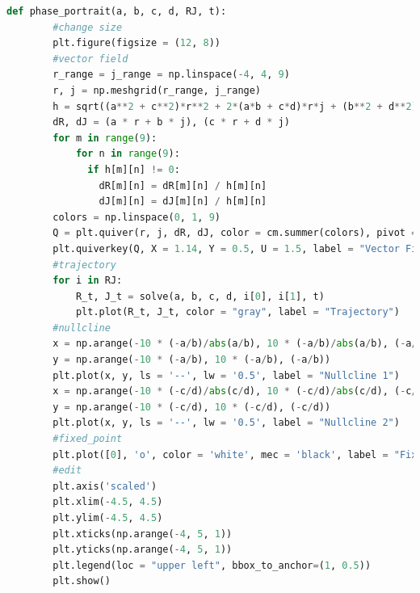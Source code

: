 \documentclass[a4paper]{article}
\begin{document}
\begin{lstlisting}[language=Python] 
    def phase_portrait(a, b, c, d, RJ, t):
        #change size
        plt.figure(figsize = (12, 8))
        #vector field
        r_range = j_range = np.linspace(-4, 4, 9)
        r, j = np.meshgrid(r_range, j_range)
        h = sqrt((a**2 + c**2)*r**2 + 2*(a*b + c*d)*r*j + (b**2 + d**2)*j**2)
        dR, dJ = (a * r + b * j), (c * r + d * j)
        for m in range(9):
            for n in range(9):
              if h[m][n] != 0:
                dR[m][n] = dR[m][n] / h[m][n]
                dJ[m][n] = dJ[m][n] / h[m][n]
        colors = np.linspace(0, 1, 9)
        Q = plt.quiver(r, j, dR, dJ, color = cm.summer(colors), pivot = "mid", headlength = 4, headaxislength = 4, headwidth = 4)
        plt.quiverkey(Q, X = 1.14, Y = 0.5, U = 1.5, label = "Vector Field", labelpos = 'E', labelsep = 0.1)
        #trajectory
        for i in RJ:
            R_t, J_t = solve(a, b, c, d, i[0], i[1], t)
            plt.plot(R_t, J_t, color = "gray", label = "Trajectory")
        #nullcline
        x = np.arange(-10 * (-a/b)/abs(a/b), 10 * (-a/b)/abs(a/b), (-a/b)/abs(a/b))
        y = np.arange(-10 * (-a/b), 10 * (-a/b), (-a/b))
        plt.plot(x, y, ls = '--', lw = '0.5', label = "Nullcline 1")
        x = np.arange(-10 * (-c/d)/abs(c/d), 10 * (-c/d)/abs(c/d), (-c/d)/abs(c/d))
        y = np.arange(-10 * (-c/d), 10 * (-c/d), (-c/d))
        plt.plot(x, y, ls = '--', lw = '0.5', label = "Nullcline 2")
        #fixed_point
        plt.plot([0], 'o', color = 'white', mec = 'black', label = "Fixed Point")
        #edit
        plt.axis('scaled')
        plt.xlim(-4.5, 4.5)
        plt.ylim(-4.5, 4.5)
        plt.xticks(np.arange(-4, 5, 1))
        plt.yticks(np.arange(-4, 5, 1))
        plt.legend(loc = "upper left", bbox_to_anchor=(1, 0.5))  
        plt.show()
\end{lstlisting}
\end{document}
